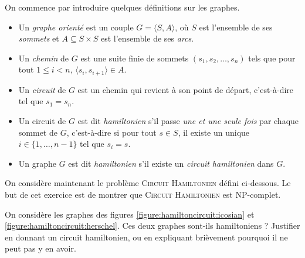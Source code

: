 \begin{exercice}[\textsc{Circuit Hamiltonien} est NP-complet%
    \footnote{Vidéo détaillée de la réduction de \textsc{3-SAT} à \textsc{Cycle Hamiltonien} : \url{https://www.youtube.com/watch?v=OHnX-R_SBpM}}]
  \label{exo:reductions/complexity/hamiltonian}

  On commence par introduire quelques définitions sur les graphes.
  \begin{itemize}
  \item Un \emph{graphe orienté} est un couple $G = \langle S, A \rangle$,
    où $S$ est l'ensemble de ses \emph{sommets}
    et $A \subseteq S \times S$ est l'ensemble de ses \emph{arcs}.
  \item Un \emph{chemin} de $G$ est une suite finie de sommets $(s_1, s_2, \dots, s_n)$
    tels que pour tout $1 \le i < n$, $\langle s_i, s_{i+1} \rangle \in A$.
  \item Un \emph{circuit} de $G$ est un chemin qui revient à son point de départ, c'est-à-dire tel que $s_1 = s_n$.
  \item Un circuit de $G$ est dit \emph{hamiltonien} s'il passe \emph{une et une seule fois} par chaque sommet de $G$,
    c'est-à-dire si pour tout $s\in S$, il existe un unique $i \in \{1, \dots, n-1\}$ tel que $s_i = s$.
  \item Un graphe $G$ est dit \emph{hamiltonien} s'il existe un \emph{circuit hamiltonien} dans $G$.
  \end{itemize}

  On considère maintenant le problème \textsc{Circuit Hamiltonien} défini ci-dessous.
  Le but de cet exercice est de montrer que \textsc{Circuit Hamiltonien} est NP-complet.


  \begin{question}
  \item On considère les graphes des figures \ref{figure:hamiltoncircuit:icosian} et \ref{figure:hamiltoncircuit:herschel}.
    Ces deux graphes sont-ils hamiltoniens ?
    Justifier en donnant un circuit hamiltonien, ou en expliquant brièvement pourquoi il ne peut pas y en avoir.
  \end{question}

  \begin{figure}[h]%
    \centering
    \icosian%
    \herschel%
  \end{figure}

  \ifcorrection{\newpage}


\end{exercice}
